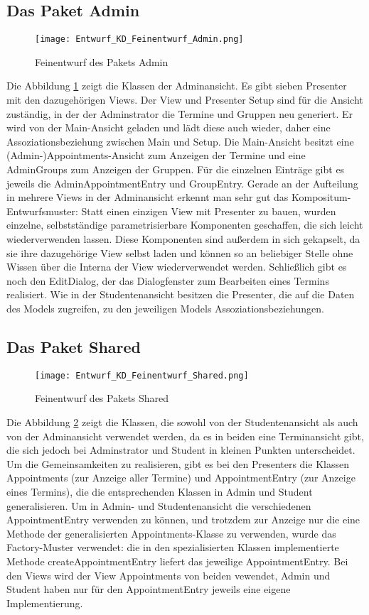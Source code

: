  \subsection{Das Paket Admin}
 \begin{figure}
  \texttt{[image: Entwurf\_KD\_Feinentwurf\_Admin.png]}
  \label{fig:Klassendiagramm_Admin}
  \caption{Feinentwurf des Pakets Admin}
 \end{figure}

 Die Abbildung \ref{fig:Klassendiagramm_Admin} zeigt die Klassen der Adminansicht. Es gibt sieben Presenter mit den dazugehörigen Views.
 Der View und Presenter Setup sind für die Ansicht zuständig, in der der Adminstrator die Termine und Gruppen neu generiert. Er wird von der Main-Ansicht geladen und lädt diese auch wieder, daher eine Assoziationsbeziehung zwischen Main und Setup.
 Die Main-Ansicht besitzt eine (Admin-)Appointments-Ansicht zum Anzeigen der Termine und eine AdminGroups zum Anzeigen der Gruppen.
 Für die einzelnen Einträge gibt es jeweils die AdminAppointmentEntry und GroupEntry.
 Gerade an der Aufteilung in mehrere Views in der Adminansicht erkennt man sehr gut das Kompositum-Entwurfsmuster: Statt einen einzigen View mit Presenter zu bauen, wurden einzelne, selbstständige parametrisierbare Komponenten geschaffen, die sich leicht wiederverwenden lassen.
 Diese Komponenten sind außerdem in sich gekapselt, da sie ihre dazugehörige View selbst laden und können so an beliebiger Stelle ohne Wissen über die Interna der View wiederverwendet werden.
 Schließlich gibt es noch den EditDialog, der das Dialogfenster zum Bearbeiten eines Termins realisiert.
 Wie in der Studentenansicht besitzen die Presenter, die auf die Daten des Models zugreifen, zu den jeweiligen Models Assoziationsbeziehungen.

 \subsection{Das Paket Shared}
 \begin{figure}
  \texttt{[image: Entwurf\_KD\_Feinentwurf\_Shared.png]}
  \label{fig:Klassendiagramm_Shared}
  \caption{Feinentwurf des Pakets Shared}
 \end{figure}

 Die Abbildung \ref{fig:Klassendiagramm_Shared} zeigt die Klassen, die sowohl von der Studentenansicht als auch von der Adminansicht verwendet werden, da es in beiden eine Terminansicht gibt, die sich jedoch bei Adminstrator und Student in kleinen Punkten unterscheidet.
 Um die Gemeinsamkeiten zu realisieren, gibt es bei den Presenters die Klassen Appointments (zur Anzeige aller Termine) und AppointmentEntry (zur Anzeige eines Termins), die die entsprechenden Klassen in Admin und Student generalisieren.
 Um in Admin- und Studentenansicht die verschiedenen AppointmentEntry verwenden zu können, und trotzdem zur Anzeige nur die eine Methode der generalisierten Appointments-Klasse zu verwenden, wurde das Factory-Muster verwendet: die in den spezialisierten Klassen implementierte Methode createAppointmentEntry liefert das jeweilige AppointmentEntry.
 Bei den Views wird der View Appointments von beiden vewendet, Admin und Student haben nur für den AppointmentEntry jeweils eine eigene Implementierung.

